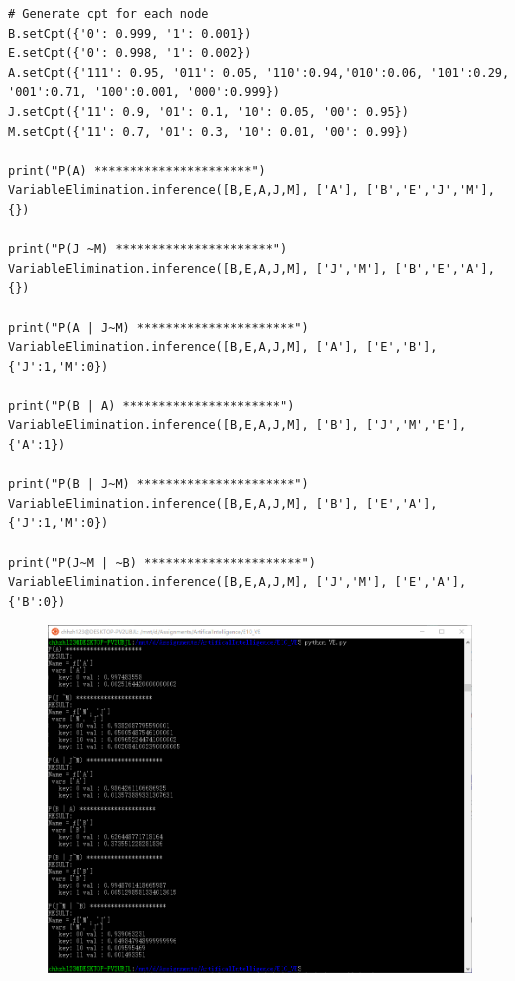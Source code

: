 \documentclass[a4paper, 11pt]{article}
\begin{document}
\begin{lstlisting}
# Generate cpt for each node
B.setCpt({'0': 0.999, '1': 0.001})
E.setCpt({'0': 0.998, '1': 0.002})
A.setCpt({'111': 0.95, '011': 0.05, '110':0.94,'010':0.06, '101':0.29, '001':0.71, '100':0.001, '000':0.999})
J.setCpt({'11': 0.9, '01': 0.1, '10': 0.05, '00': 0.95})
M.setCpt({'11': 0.7, '01': 0.3, '10': 0.01, '00': 0.99})

print("P(A) **********************")
VariableElimination.inference([B,E,A,J,M], ['A'], ['B','E','J','M'], {})

print("P(J ~M) **********************")
VariableElimination.inference([B,E,A,J,M], ['J','M'], ['B','E','A'], {})

print("P(A | J~M) **********************")
VariableElimination.inference([B,E,A,J,M], ['A'], ['E','B'], {'J':1,'M':0})

print("P(B | A) **********************")
VariableElimination.inference([B,E,A,J,M], ['B'], ['J','M','E'], {'A':1})

print("P(B | J~M) **********************")
VariableElimination.inference([B,E,A,J,M], ['B'], ['E','A'], {'J':1,'M':0})

print("P(J~M | ~B) **********************")
VariableElimination.inference([B,E,A,J,M], ['J','M'], ['E','A'], {'B':0})
\end{lstlisting}

\begin{figure}[H]
\centering
\includegraphics[width=\linewidth]{fig/results.png}
\end{figure}
\end{document}

